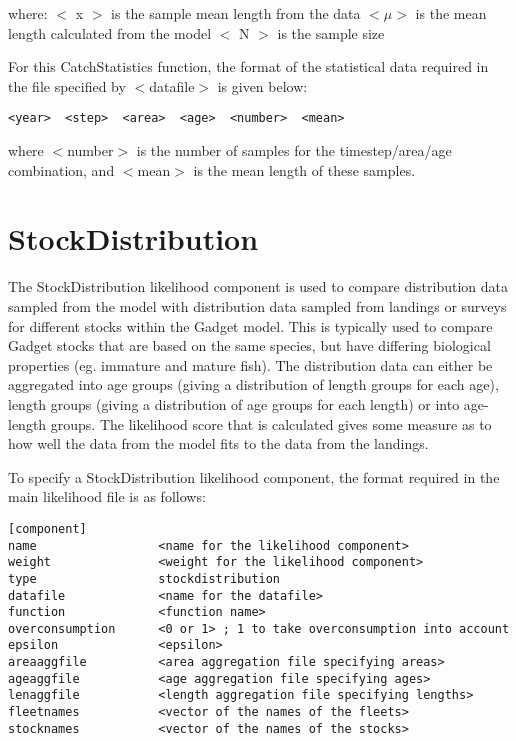 \documentclass [a4paper, 10pt]{book}
\begin{document}
where:\newline
$<$ x $>$ is the sample mean length from the data\newline
$<\mu>$ is the mean length calculated from the model\newline
$<$ N $>$ is the sample size

\bigskip
For this CatchStatistics function, the format of the statistical data required in the file specified by $<$datafile$>$ is given below:

{\small\begin{verbatim}
<year>  <step>  <area>  <age>  <number>  <mean>
\end{verbatim}}

where $<$number$>$ is the number of samples for the timestep/area/age combination, and $<$mean$>$ is the mean length of these samples.

\section{StockDistribution}\label{sec:stockdist}
The StockDistribution likelihood component is used to compare distribution data sampled from the model with distribution data sampled from landings or surveys for different stocks within the Gadget model.  This is typically used to compare Gadget stocks that are based on the same species, but have differing biological properties (eg. immature and mature fish).  The distribution data can either be aggregated into age groups (giving a distribution of length groups for each age), length groups (giving a distribution of age groups for each length) or into age-length groups.  The likelihood score that is calculated gives some measure as to how well the data from the model fits to the data from the landings.

\bigskip
To specify a StockDistribution likelihood component, the format required in the main likelihood file is as follows:

{\small\begin{verbatim}
[component]
name                 <name for the likelihood component>
weight               <weight for the likelihood component>
type                 stockdistribution
datafile             <name for the datafile>
function             <function name>
overconsumption      <0 or 1> ; 1 to take overconsumption into account
epsilon              <epsilon>
areaaggfile          <area aggregation file specifying areas>
ageaggfile           <age aggregation file specifying ages>
lenaggfile           <length aggregation file specifying lengths>
fleetnames           <vector of the names of the fleets>
stocknames           <vector of the names of the stocks>
\end{verbatim}}
\end{document}

